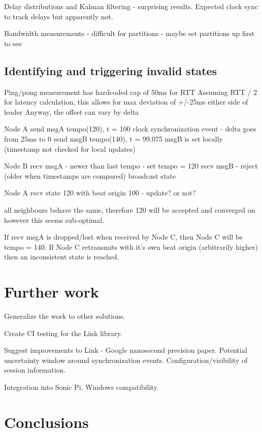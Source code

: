 \documentclass[11pt]{article} %
\theoremstyle{plain}
\theoremstyle{definition}
\begin{document}
Delay distributions and Kalman filtering - surprising results. Expected clock sync to track delays but apparently not.

Bandwidth measurements - difficult for partitions - maybe set partitions up first to see

\subsection{Identifying and triggering invalid states}

Ping/pong measurement has hardcoded cap of 50ms for RTT
Assuming RTT / 2 for latency calculation, this allows for max deviation of +/-25ms either side of leader
Anyway, the offset can vary by delta

Node A
send msgA tempo(120), t = 100
clock synchronization event - delta goes from 25ms to 0
send msgB tempo(140), t = 99.075
msgB is set locally (timestamp not checked for local updates)

Node B
recv msgA - newer than last tempo - set tempo = 120
recv msgB - reject (older when timestamps are compared)
broadcast state

Node A
recv state 120 with beat origin 100 - update? or not?

all neighbours behave the same, therefore 120 will be accepted and converged on however this seems sub-optimal.

If recv msgA is dropped/lost when received by Node C, then Node C will be tempo
= 140. If Node C retransmits with it's own beat origin (arbitrarily higher) then an inconsistent state is reached.


\section{Further work}

Generalize the work to other solutions.

Create CI testing for the Link library.

Suggest improvements to Link - Google nanosecond precision paper. Potential
uncertainty window around synchronization events. Configuration/visibility of
session information.

Integration into Sonic Pi. Windows compatibility.

\section{Conclusions}



\end{document}
